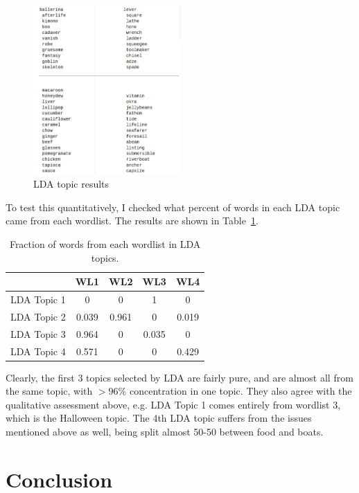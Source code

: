 \documentclass{article}
\begin{document}
\begin{figure}
  \centering
  \includegraphics[width=0.5\textwidth]{ldatopics}
  \caption{LDA topic results}
  \label{fig:ldatopics}
\end{figure}

To test this quantitatively, I checked what percent of words in each LDA topic
came from each wordlist. The results are shown in Table~\ref{tab:percents}. 

\begin{table}
  \centering
  \begin{tabular}{l|c|c|c|c|}
    & WL1 & WL2 & WL3 & WL4 \\ \hline \hline
    LDA Topic 1 &  0 & 0 & 1 & 0 \\ \hline
    LDA Topic 2 & 0.039 & 0.961 & 0 & 0.019\\ \hline
    LDA Topic 3 & 0.964 & 0 & 0.035 & 0 \\ \hline
    LDA Topic 4 & 0.571 & 0 & 0 & 0.429
  \end{tabular}
  \caption{Fraction of words from each wordlist in LDA topics.}
  \label{tab:percents}
\end{table}

Clearly, the first 3 topics selected by LDA are fairly pure, and are almost all
from the same topic, with $>96\%$ concentration in one topic. They also agree
with the qualitative assessment above, e.g. LDA Topic 1 comes entirely from
wordlist 3, which is the Halloween topic. The 4th LDA topic suffers from the
issues mentioned above as well, being split almost 50-50 between food and boats.

\section{Conclusion}
\end{document}
